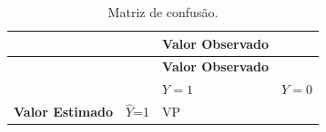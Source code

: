 \documentclass[12pt,brazil,oneside]{book}
\begin{document}
\begin{longtable}[]{@{}llll@{}}
\caption{\label{tab:matriz}Matriz de confusão.}\tabularnewline
\toprule
\begin{minipage}[b]{0.25\columnwidth}\raggedright
\strut
\end{minipage} & \begin{minipage}[b]{0.15\columnwidth}\raggedright
\strut
\end{minipage} & \begin{minipage}[b]{0.25\columnwidth}\raggedright
\textbf{Valor Observado}\strut
\end{minipage} & \begin{minipage}[b]{0.14\columnwidth}\raggedright
\strut
\end{minipage}\tabularnewline
\midrule
\endfirsthead
\toprule
\begin{minipage}[b]{0.25\columnwidth}\raggedright
\strut
\end{minipage} & \begin{minipage}[b]{0.15\columnwidth}\raggedright
\strut
\end{minipage} & \begin{minipage}[b]{0.25\columnwidth}\raggedright
\textbf{Valor Observado}\strut
\end{minipage} & \begin{minipage}[b]{0.14\columnwidth}\raggedright
\strut
\end{minipage}\tabularnewline
\midrule
\endhead
\begin{minipage}[t]{0.25\columnwidth}\raggedright
\strut
\end{minipage} & \begin{minipage}[t]{0.15\columnwidth}\raggedright
\strut
\end{minipage} & \begin{minipage}[t]{0.25\columnwidth}\raggedright
\(Y=1\)\strut
\end{minipage} & \begin{minipage}[t]{0.14\columnwidth}\raggedright
\(Y=0\)\strut
\end{minipage}\tabularnewline
\begin{minipage}[t]{0.25\columnwidth}\raggedright
\textbf{Valor Estimado}\strut
\end{minipage} & \begin{minipage}[t]{0.15\columnwidth}\raggedright
\(\hat Y\)=1\strut
\end{minipage} & \begin{minipage}[t]{0.25\columnwidth}\raggedright
VP\strut
\end{minipage} & \begin{minipage}[t]{0.14\columnwidth}\raggedright

\end{minipage}
\end{longtable}
\end{document}
